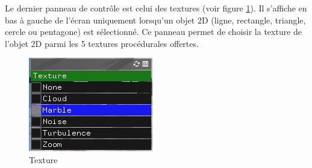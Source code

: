 Le dernier panneau de contrôle est celui des textures (voir figure \ref{fig:texture}).
Il s'affiche en bas à gauche de l'écran uniquement lorsqu'un objet 2D (ligne, rectangle, triangle, cercle ou pentagone) est sélectionné.
Ce panneau permet de choisir la texture de l'objet 2D parmi les 5 textures procédurales offertes.

\begin{figure}[H]
    \centering
	\includegraphics[scale=0.6]{fig/texture.png}
	\caption{Texture}
	\label{fig:texture}
\end{figure}
